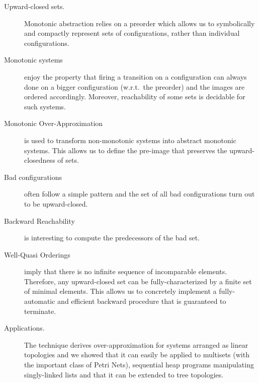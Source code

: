 \begin{description}
\item[Upward-closed sets.] Monotonic abstraction relies on a preorder
  which allows us to symbolically and compactly represent sets of
  configurations, rather than individual configurations.
\item[Monotonic systems] enjoy the property that firing a transition
  on a configuration can always done on a bigger configuration
  (w.r.t.\ the preorder) and the images are ordered accordingly. %
  Moreover, reachability of some sets is decidable for such systems.
\item[Monotonic Over-Approximation] is used to transform non-monotonic
  systems into abstract monotonic systems. This allows us to define
  the pre-image that preserves the upward-closedness of sets.
\item[Bad configurations] often follow a simple pattern and the set of
  all bad configurations turn out to be upward-closed.
\item[Backward Reachability] is interesting to compute the
  predecessors of the bad set.
\item[Well-Quasi Orderings] imply that there is no infinite sequence
  of incomparable elements. Therefore, any upward-closed set can be
  fully-characterized by a finite set of minimal elements. This allows
  us to concretely implement a fully-automatic and efficient backward
  procedure that is guaranteed to terminate.
\item[Applications.] The technique derives over-approximation for
  systems arranged as linear topologies and we showed that it can
  easily be applied to multisets (with the important class of Petri
  Nets), sequential heap programs manipulating singly-linked lists and
  that it can be extended to tree topologies.
\end{description}
